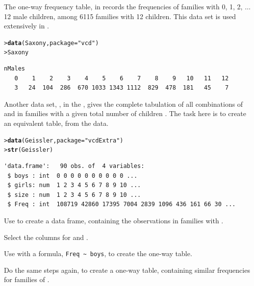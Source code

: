 \documentclass[10pt,krantz2]{krantz}\usepackage[]{graphicx}\usepackage[]{color}
\makeatletter
\newcommand{\hlstr}[1]{\textcolor[rgb]{0.192,0.494,0.8}{#1}}%
\newcommand{\hlstd}[1]{\textcolor[rgb]{0.345,0.345,0.345}{#1}}%
\newcommand{\hlkwc}[1]{\textcolor[rgb]{0.333,0.667,0.333}{#1}}%
\newcommand{\hlkwd}[1]{\textcolor[rgb]{0.737,0.353,0.396}{\textbf{#1}}}%
\newenvironment{kframe}{%
 \def\at@end@of@kframe{}%
 \ifinner\ifhmode%
  \def\at@end@of@kframe{\end{minipage}}%
  \begin{minipage}{\columnwidth}%
 \fi\fi%
 \def\FrameCommand##1{\hskip\@totalleftmargin \hskip-\fboxsep
 \colorbox{shadecolor}{##1}\hskip-\fboxsep
     \hskip-\linewidth \hskip-\@totalleftmargin \hskip\columnwidth}%
 \MakeFramed {\advance\hsize-\width
   \@totalleftmargin\z@ \linewidth\hsize
   \@setminipage}}%
 {\par\unskip\endMakeFramed%
 \at@end@of@kframe}
\newenvironment{knitrout}{}{} %
\renewenvironment{knitrout}{\small\renewcommand{\baselinestretch}{.85}}{} %
\makeatother
\begin{document}
\begin{Exercises}
\exercise The one-way frequency table,  in  records the frequencies
of families with 0, 1, 2, $\dots$ 12 male children, among 6115 families with 12
children.  This data set is used extensively in .
\begin{knitrout}
\color{fgcolor}\begin{kframe}
\begin{alltt}
\hlstd{> }\hlkwd{data}\hlstd{(Saxony,} \hlkwc{package}\hlstd{=}\hlstr{"vcd"}\hlstd{)}
\hlstd{> }\hlstd{Saxony}
\end{alltt}
\begin{verbatim}
nMales
   0    1    2    3    4    5    6    7    8    9   10   11   12 
   3   24  104  286  670 1033 1343 1112  829  478  181   45    7 
\end{verbatim}
\end{kframe}
\end{knitrout}
Another data set, , in the , gives the complete
tabulation of all combinations of  and  in families with
a given total number of children .  The task here is to create an
equivalent table,  from the  data.
\begin{knitrout}
\color{fgcolor}\begin{kframe}
\begin{alltt}
\hlstd{> }\hlkwd{data}\hlstd{(Geissler,} \hlkwc{package}\hlstd{=}\hlstr{"vcdExtra"}\hlstd{)}
\hlstd{> }\hlkwd{str}\hlstd{(Geissler)}
\end{alltt}
\begin{verbatim}
'data.frame':	90 obs. of  4 variables:
 $ boys : int  0 0 0 0 0 0 0 0 0 0 ...
 $ girls: num  1 2 3 4 5 6 7 8 9 10 ...
 $ size : num  1 2 3 4 5 6 7 8 9 10 ...
 $ Freq : int  108719 42860 17395 7004 2839 1096 436 161 66 30 ...
\end{verbatim}
\end{kframe}
\end{knitrout}
  \begin{enumerate*}
    \item Use  to create a data frame,  containing
    the  observations in families with .
    \item Select the columns for  and .
    \item Use  with a formula, \verb|Freq ~ boys|, to create the
    one-way table.
    \item Do the same steps again, to create a one-way table, 
    containing similar frequencies for families of .
  \end{enumerate*}


\end{Exercises}
\end{document}
